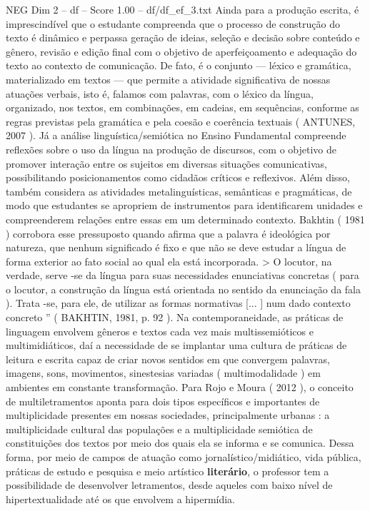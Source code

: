 \begin{textsample}{NEG Dim 2 – df – Score 1.00 – df/df\_ef\_3.txt}
Ainda para a produção escrita, é imprescindível que o estudante compreenda que o processo de construção do texto é dinâmico e perpassa geração de ideias, seleção e decisão sobre conteúdo e gênero, revisão e edição final com o objetivo de aperfeiçoamento e adequação do texto ao contexto de comunicação.
De fato, é o conjunto — léxico e gramática, materializado em textos — que permite a atividade significativa de nossas atuações verbais, isto é, falamos com palavras, com o léxico da língua, organizado, nos textos, em combinações, em cadeias, em sequências, conforme as regras previstas pela gramática e pela coesão e coerência textuais ( ANTUNES, 2007 ).
Já a análise linguística/semiótica no Ensino Fundamental compreende reflexões sobre o uso da língua na produção de discursos, com o objetivo de promover interação entre os sujeitos em diversas situações comunicativas, possibilitando posicionamentos como cidadãos críticos e reflexivos.
Além disso, também considera as atividades metalinguísticas, semânticas e pragmáticas, de modo que estudantes se apropriem de instrumentos para identificarem unidades e compreenderem relações entre essas em um determinado contexto.
Bakhtin ( 1981 ) corrobora esse pressuposto quando afirma que a palavra é ideológica por natureza, que nenhum significado é fixo e que não se deve estudar a língua de forma exterior ao fato social ao qual ela está incorporada. > O locutor, na verdade, serve -se da língua para suas necessidades enunciativas concretas ( para o locutor, a construção da língua está orientada no sentido da enunciação da fala ).
Trata -se, para ele, de utilizar as formas normativas [... ] num dado contexto concreto ” ( BAKHTIN, 1981, p. 92 ).
Na contemporaneidade, as práticas de linguagem envolvem gêneros e textos cada vez mais multissemióticos e multimidiáticos, daí a necessidade de se implantar uma cultura de práticas de leitura e escrita capaz de criar novos sentidos em que convergem palavras, imagens, sons, movimentos, sinestesias variadas ( multimodalidade ) em ambientes em constante transformação.
Para Rojo e Moura ( 2012 ), o conceito de multiletramentos aponta para dois tipos específicos e importantes de multiplicidade presentes em nossas sociedades, principalmente urbanas : a multiplicidade cultural das populações e a multiplicidade semiótica de constituições dos textos por meio dos quais ela se informa e se comunica.
Dessa forma, por meio de campos de atuação como jornalístico/midiático, vida pública, práticas de estudo e pesquisa e meio artístico \textbf{literário}, o professor tem a possibilidade de desenvolver letramentos, desde aqueles com baixo nível de hipertextualidade até os que envolvem a hipermídia.

\end{textsample}
